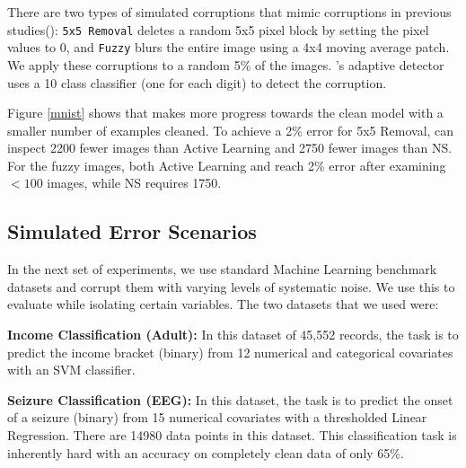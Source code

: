 There are two types of simulated corruptions that mimic corruptions in previous studies(): \texttt{5x5 Removal} deletes a random 5x5 pixel block by setting the pixel values to 0, and \texttt{Fuzzy} blurs the entire image using a 4x4 moving average patch. 
We apply these corruptions to a random 5\% of the images.%
\sys's adaptive detector uses a 10 class classifier (one for each digit) to detect the corruption.

Figure \ref{mnist} shows that \sys makes more progress towards the clean model with a smaller number of examples cleaned.
To achieve a 2\% error for 5x5 Removal, \sys can inspect 2200 fewer images than Active Learning and 2750 fewer images than NS.
For the fuzzy images, both Active Learning and \sys reach 2\% error after examining $<100$ images, while NS requires 1750.

\subsection{Simulated Error Scenarios}
In the next set of experiments, we use standard Machine Learning benchmark datasets and corrupt them with varying levels of systematic noise.
We use this to evaluate \sys while isolating certain variables.
The two datasets that we used were:

\vspace{0.25em}

\noindent\textbf{Income Classification (Adult): } In this dataset of 45,552 records, the task is to predict the income bracket (binary) from 12 numerical and categorical covariates with an SVM classifier. 

\vspace{0.25em}

\noindent\textbf{Seizure Classification (EEG): } In this dataset, the task is to predict the onset of a seizure (binary) from 15 numerical covariates with a thresholded Linear Regression. There are 14980 data points in this dataset. This classification task is inherently hard with an accuracy on completely clean data of only 65\%.


